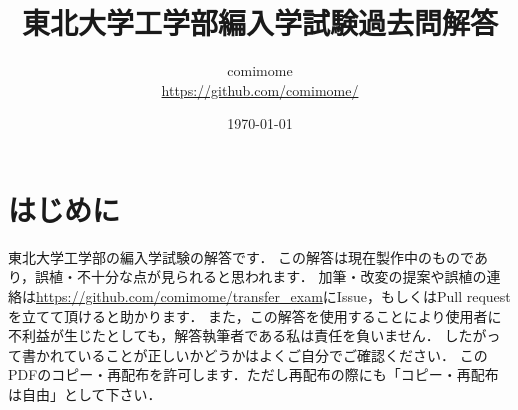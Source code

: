 \documentclass[10pt]{jsarticle}
\begin{document}
\title{東北大学工学部編入学試験過去問解答}
\author{comimome \\ \url{https://github.com/comimome/}}
\date{\today}
\maketitle

\tableofcontents%
\newpage

\part{はじめに}

東北大学工学部の編入学試験の解答です．
この解答は現在製作中のものであり，誤植・不十分な点が見られると思われます．
加筆・改変の提案や誤植の連絡は\url{https://github.com/comimome/transfer_exam}にIssue，もしくはPull requestを立てて頂けると助かります．
また，この解答を使用することにより使用者に不利益が生じたとしても，解答執筆者である私は責任を負いません．
したがって書かれていることが正しいかどうかはよくご自分でご確認ください．
このPDFのコピー・再配布を許可します．ただし再配布の際にも「コピー・再配布は自由」として下さい．

\newpage


\end{document}
